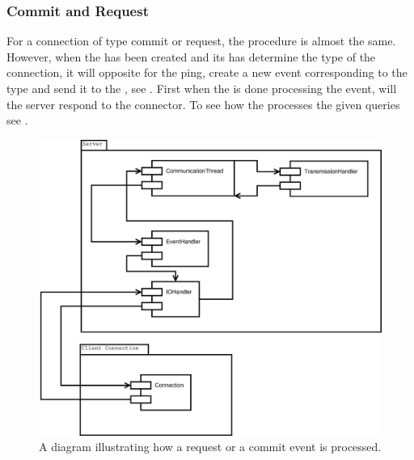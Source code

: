 \subsubsection*{Commit and Request}
For a connection of type commit or request, the procedure is almost the same. However, when the  has been created and its  has determine the type of the connection, it will opposite for the ping, create a new event corresponding to the type and send it to the , see .
First when the  is done processing the event, will the server respond to the connector.
To see how the  processes the given queries see .

\begin{figure}[htbp]
	\centering
		\includegraphics[scale=0.30]{images/requestCommit.eps} %
	\caption{A diagram illustrating how a request or a commit event is processed.}
	\label{fig:IOCR}
\end{figure}
